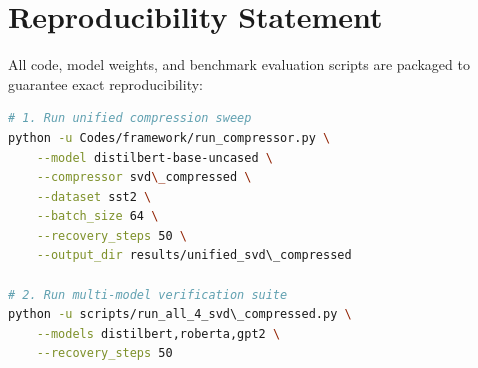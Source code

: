 \section{Reproducibility Statement}
All code, model weights, and benchmark evaluation scripts are packaged to guarantee exact reproducibility:
\begin{lstlisting}[language=bash]
# 1. Run unified compression sweep
python -u Codes/framework/run_compressor.py \
    --model distilbert-base-uncased \
    --compressor svd\_compressed \
    --dataset sst2 \
    --batch_size 64 \
    --recovery_steps 50 \
    --output_dir results/unified_svd\_compressed

# 2. Run multi-model verification suite
python -u scripts/run_all_4_svd\_compressed.py \
    --models distilbert,roberta,gpt2 \
    --recovery_steps 50
\end{lstlisting}
